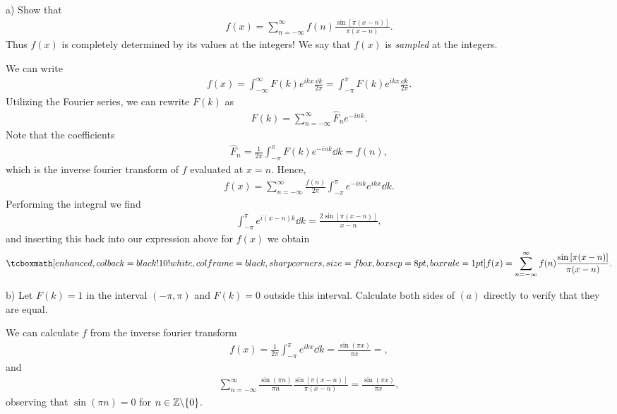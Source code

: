 a) Show that 
\begin{eqnarray}
    f(x) = \sum_{n=-\infty}^{\infty} f(n) \frac{\sin{[\pi (x-n)]}}{\pi(x-n)}
.\end{eqnarray}
Thus $f(x)$ is completely determined by its values at the integers!
We say that $f(x)$ is \textit{sampled} at the integers.

We can write
\begin{eqnarray}
    f(x) = \int_{-\infty}^{\infty} F(k) e^{ikx} \frac{\dd{k}}{2\pi} = \int_{-\pi}^{\pi} F(k) e^{ikx} \frac{\dd{k}}{2\pi}
.\end{eqnarray}
Utilizing the Fourier series, we can rewrite $F(k)$ as
\begin{eqnarray}
    F(k) = \sum_{n=-\infty}^{\infty} \hat{F}_n e^{-ink}
.\end{eqnarray}
Note that the coefficients
\begin{eqnarray}
    \hat{F}_{n} = \frac{1}{2\pi} \int_{-\pi}^{\pi} F(k) e^{-ink} \dd{k} = f(n)
,\end{eqnarray}
which is the inverse fourier transform of $f$ evaluated at $x = n$.
Hence,
\begin{eqnarray}
    f(x) = \sum_{n=-\infty}^{\infty} \frac{f(n)}{2\pi} \int_{-\pi}^{\pi} e^{-ink} e^{ikx} \dd{k}
.\end{eqnarray}
Performing the integral we find
\begin{eqnarray}
    \int_{-\pi}^{\pi} e^{i(x-n)k} \dd{k} = \frac{2 \sin{[\pi(x-n)]}}{x-n}
,\end{eqnarray}
and inserting this back into our expression above for $f(x)$ we obtain
\begin{eqnarray}
    \eqbox{
    f(x) = \sum_{n=-\infty}^{\infty} f(n) \frac{\sin{[\pi(x-n)]}}{\pi(x-n)}
}
.\end{eqnarray}


b) Let $F(k) = 1$ in the interval $(-\pi,\pi)$ and $F(k) = 0$ outside this interval.
Calculate both sides of $(a)$ directly to verify that they are equal.

We can calculate $f$ from the inverse fourier transform
\begin{eqnarray}
    f(x) = \frac{1}{2\pi}\int_{-\pi}^{\pi} e^{ikx} \dd{k} = \frac{\sin{(\pi x)}}{\pi x} = 
,\end{eqnarray}
and
\begin{eqnarray}
    \sum_{n=-\infty}^{\infty} \frac{\sin{(\pi n)}}{\pi n} \frac{\sin{[\pi(x - n)]}}{\pi(x-n)} = \frac{\sin{(\pi x)}}{\pi x}
,\end{eqnarray}
observing that $\sin{(\pi n)} = 0$ for $n \in \mathbb{Z} \backslash \{ 0 \} $.




